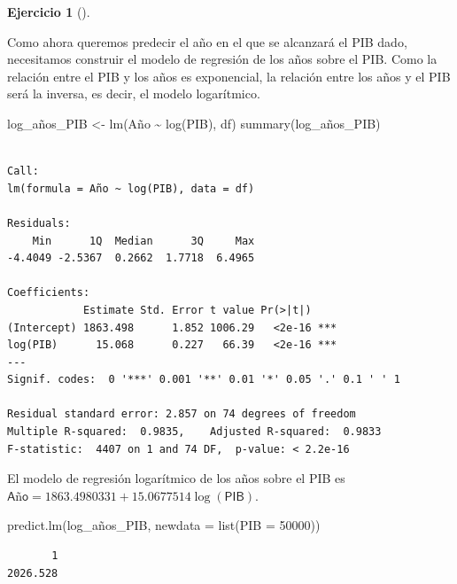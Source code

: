 \documentclass[
  a4paper,
]{scrreport}
\newenvironment{Shaded}{\begin{snugshade}}{\end{snugshade}}
\newcommand{\AttributeTok}[1]{\textcolor[rgb]{0.40,0.45,0.13}{#1}}
\newcommand{\DecValTok}[1]{\textcolor[rgb]{0.68,0.00,0.00}{#1}}
\newcommand{\FunctionTok}[1]{\textcolor[rgb]{0.28,0.35,0.67}{#1}}
\newcommand{\NormalTok}[1]{\textcolor[rgb]{0.00,0.23,0.31}{#1}}
\newcommand{\OtherTok}[1]{\textcolor[rgb]{0.00,0.23,0.31}{#1}}
\newcommand{\SpecialCharTok}[1]{\textcolor[rgb]{0.37,0.37,0.37}{#1}}
\theoremstyle{definition}
\newtheorem{exercise}{Ejercicio}[chapter]
\theoremstyle{remark}
\begin{document}
\begin{exercise}[]
\begin{enumerate}
\begin{tcolorbox}
  Como ahora queremos predecir el año en el que se alcanzará el PIB
  dado, necesitamos construir el modelo de regresión de los años sobre
  el PIB. Como la relación entre el PIB y los años es exponencial, la
  relación entre los años y el PIB será la inversa, es decir, el modelo
  logarítmico.

\begin{Shaded}
\begin{Highlighting}[]
\NormalTok{log\_años\_PIB }\OtherTok{\textless{}{-}} \FunctionTok{lm}\NormalTok{(Año }\SpecialCharTok{\textasciitilde{}} \FunctionTok{log}\NormalTok{(PIB), df) }
\FunctionTok{summary}\NormalTok{(log\_años\_PIB)}
\end{Highlighting}
\end{Shaded}

\begin{verbatim}

Call:
lm(formula = Año ~ log(PIB), data = df)

Residuals:
    Min      1Q  Median      3Q     Max 
-4.4049 -2.5367  0.2662  1.7718  6.4965 

Coefficients:
            Estimate Std. Error t value Pr(>|t|)    
(Intercept) 1863.498      1.852 1006.29   <2e-16 ***
log(PIB)      15.068      0.227   66.39   <2e-16 ***
---
Signif. codes:  0 '***' 0.001 '**' 0.01 '*' 0.05 '.' 0.1 ' ' 1

Residual standard error: 2.857 on 74 degrees of freedom
Multiple R-squared:  0.9835,    Adjusted R-squared:  0.9833 
F-statistic:  4407 on 1 and 74 DF,  p-value: < 2.2e-16
\end{verbatim}

  El modelo de regresión logarítmico de los años sobre el PIB es
  \(\textsf{Año}= 1863.4980331 + 15.0677514 \log(\textsf{PIB})\).

\begin{Shaded}
\begin{Highlighting}[]
\FunctionTok{predict.lm}\NormalTok{(log\_años\_PIB, }\AttributeTok{newdata =} \FunctionTok{list}\NormalTok{(}\AttributeTok{PIB =} \DecValTok{50000}\NormalTok{))}
\end{Highlighting}
\end{Shaded}

\begin{verbatim}
       1 
2026.528 
\end{verbatim}

  \end{tcolorbox}
\end{enumerate}

\end{exercise}
\end{document}
